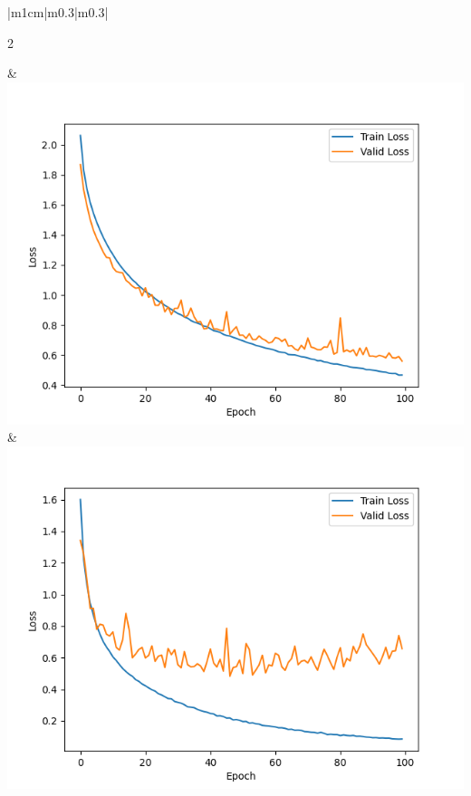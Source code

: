 \documentclass{article}%
\begin{document}
\begin{table}[H]
\begin{tabular}{|m{1cm}|m{0.3\linewidth}|m{0.3\linewidth}|}
        \hline
        \begin{center} 2 \end{center}  &\vspace{5pt} \includegraphics[width=1\linewidth]{Loss_5.png} &\vspace{5pt} \includegraphics[width=1\linewidth]{Loss_6.png} \\[0.6cm]
        \hline
    \end{tabular}
    \caption{使用不同优化器——Loss曲线}
\end{table}
\end{document}
